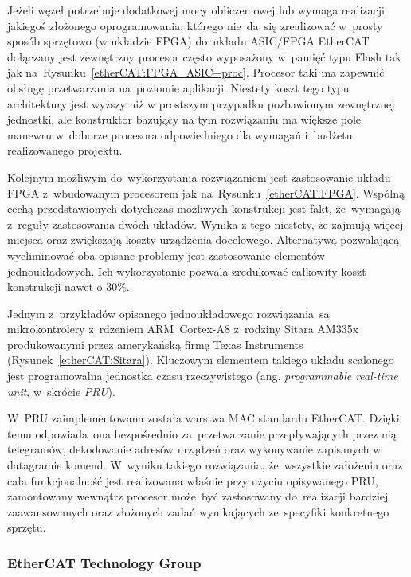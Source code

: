 Jeżeli węzeł potrzebuje dodatkowej mocy obliczeniowej lub wymaga realizacji jakiegoś złożonego oprogramowania, którego nie~da~się zrealizować w~prosty sposób sprzętowo (w układzie FPGA) do~układu ASIC/FPGA EtherCAT dołączany jest zewnętrzny procesor często wyposażony w~pamięć typu Flash tak jak na~Rysunku~\ref{etherCAT:FPGA_ASIC+proc}. Procesor taki ma zapewnić obsługę przetwarzania na~poziomie aplikacji. Niestety koszt tego typu architektury jest wyższy niż w prostszym przypadku pozbawionym zewnętrznej jednostki, ale konstruktor bazujący na tym rozwiązaniu ma większe pole manewru w~doborze procesora odpowiedniego dla wymagań i~budżetu realizowanego projektu.
\clearpage

Kolejnym możliwym do~wykorzystania rozwiązaniem jest zastosowanie układu FPGA z~wbudowanym procesorem jak na~Rysunku~\ref{etherCAT:FPGA}. Wspólną cechą przedstawionych dotychczas możliwych konstrukcji jest fakt, że~wymagają z~reguły zastosowania dwóch układów. Wynika z tego niestety, że zajmują więcej miejsca oraz zwiększają koszty urządzenia docelowego. Alternatywą pozwalającą wyeliminować oba opisane problemy jest zastosowanie elementów jednoukładowych. Ich wykorzystanie pozwala zredukować całkowity koszt konstrukcji nawet o 30\%.

Jednym z~przykładów opisanego jednoukładowego rozwiązania~są mikrokontrolery z~rdzeniem ARM~Cortex-A8 z~rodziny Sitara AM335x produkowanymi przez amerykańską firmę Texas Instruments (Rysunek~\ref{etherCAT:Sitara}). Kluczowym elementem takiego układu scalonego jest programowalna jednostka czasu rzeczywistego (ang. \textit{programmable real-time unit}, w~skrócie \textit{PRU}). 

W~PRU zaimplementowana została warstwa MAC standardu EtherCAT. Dzięki temu odpowiada~ona bezpośrednio za~przetwarzanie przepływających przez nią telegramów, dekodowanie adresów urządzeń oraz wykonywanie zapisanych w datagramie komend. W~wyniku takiego rozwiązania, że~wszystkie założenia oraz cała funkcjonalność jest realizowana właśnie przy użyciu opisywanego PRU, zamontowany wewnątrz procesor może~być zastosowany do~realizacji bardziej zaawansowanych oraz złożonych zadań wynikających ze~specyfiki konkretnego sprzętu.

\subsubsection{EtherCAT Technology Group}

